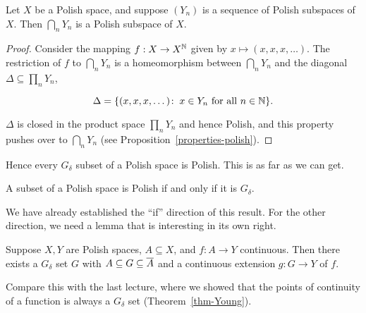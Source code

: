 \begin{proposition}\label{prop-intersection-polish}Let $X$ be a Polish space, and suppose $(Y_n)$ is a sequence of Polish subspaces of $X$. Then $\bigcap_n Y_n$ is a Polish subspace of $X$.

\end{proposition}\begin{proof}Consider the mapping $f: X \to X^{\mathbb{N}}$ given by $x \mapsto (x, x, x, \dots)$. The restriction of $f$ to $\bigcap_n Y_n$ is a homeomorphism between $\bigcap_n Y_n$ and the diagonal $\Delta \subseteq \prod_n Y_n$,

\begin{equation}
\Delta = \{(x,x,x, \dots) \colon \: x \in Y_n \text{ for all } n \in \mathbb{N} \}.
\end{equation}

$\Delta$ is closed in the product space $\prod_n Y_n$ and hence Polish, and this property pushes over to $\bigcap_n Y_n$ (see Proposition~\ref{properties-polish}).

\end{proof}Hence every $G_\delta$ subset of a Polish space is Polish. This is as far as we can get.

\begin{theorem}[Mazurkiewicz]\label{thm-subsets-polish}A subset of a Polish space is Polish if and only if it is $G_\delta$.

\end{theorem}We have already established the ``if'' direction of this result.
For the other direction, we need a lemma that is interesting in its own right.

\begin{lemma}\label{lemma-kuratowski-extension}Suppose $X, Y$ are Polish spaces, $A \subseteq X$, and $f: A \to Y$ continuous. Then there exists a $G_\delta$ set $G$ with $A \subseteq G \subseteq \overline{A}$ and a continuous extension $g : G \to Y$ of $f$.

\end{lemma}Compare this with the last lecture, where we showed that the points of continuity of a function is always a $G_\delta$ set (Theorem~\ref{thm-Young}).

